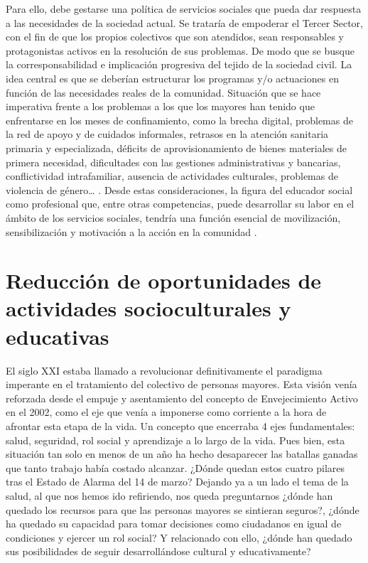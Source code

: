 \documentclass{textolivre}
\begin{document}
Para ello, debe gestarse una política de servicios sociales que pueda dar respuesta a las necesidades de la sociedad actual. Se trataría de empoderar el Tercer Sector, con el fin de que los propios colectivos que son atendidos, sean responsables y protagonistas activos en la resolución de sus problemas. De modo que se busque la corresponsabilidad e implicación progresiva del tejido de la sociedad civil. La idea central es que se deberían estructurar los programas y/o actuaciones en función de las necesidades reales de la comunidad. Situación que se hace imperativa frente a los problemas a los que los mayores han tenido que enfrentarse en los meses de confinamiento, como la brecha digital, problemas de la red de apoyo y de cuidados informales, retrasos en la atención sanitaria primaria y especializada, déficits de aprovisionamiento de bienes materiales de primera necesidad, dificultades con las gestiones administrativas y bancarias, conflictividad intrafamiliar, ausencia de actividades culturales, problemas de violencia de género… \cite{merino2020}. %
Desde estas consideraciones, la figura del educador social como profesional que, entre otras competencias, puede desarrollar su labor en el ámbito de los servicios sociales, tendría una función esencial de movilización, sensibilización y motivación a la acción en la comunidad \cite{martinezdemiguel2017}. %

\section{Reducción de oportunidades de actividades socioculturales y educativas}
El siglo XXI estaba llamado a revolucionar definitivamente el paradigma imperante en el tratamiento del colectivo de personas mayores. Esta visión venía reforzada desde el empuje y asentamiento del concepto de Envejecimiento Activo en el 2002, como el eje que venía a imponerse como corriente a la hora de afrontar esta etapa de la vida.  Un concepto que encerraba 4 ejes fundamentales: salud, seguridad, rol social y aprendizaje a lo largo de la vida. Pues bien, esta situación tan solo en menos de un año ha hecho desaparecer las batallas ganadas que tanto trabajo había costado alcanzar. ¿Dónde quedan estos cuatro pilares tras el Estado de Alarma del 14 de marzo? Dejando ya a un lado el tema de la salud, al que nos hemos ido refiriendo, nos queda preguntarnos  ¿dónde han quedado los recursos para que las personas mayores se sintieran seguros?, ¿dónde ha quedado su capacidad para tomar decisiones como ciudadanos en igual de condiciones y ejercer un rol social?  Y relacionado con ello, ¿dónde han quedado sus posibilidades de seguir desarrollándose cultural y educativamente?
\end{document}
